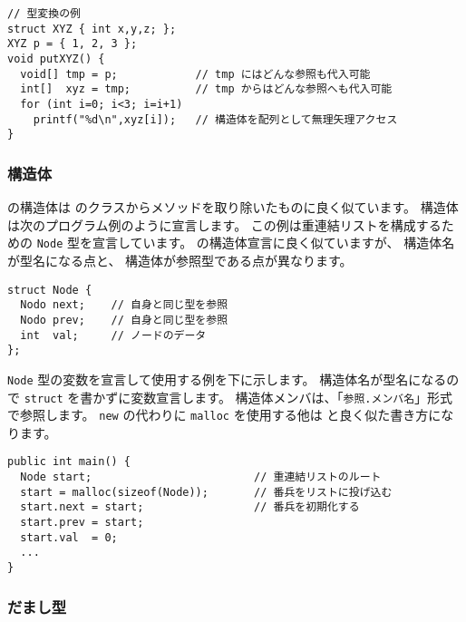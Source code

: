 \begin{mylist}
\begin{verbatim}
// 型変換の例
struct XYZ { int x,y,z; };
XYZ p = { 1, 2, 3 };
void putXYZ() {
  void[] tmp = p;            // tmp にはどんな参照も代入可能
  int[]  xyz = tmp;          // tmp からはどんな参照へも代入可能
  for (int i=0; i<3; i=i+1)
    printf("%d\n",xyz[i]);   // 構造体を配列として無理矢理アクセス
}
\end{verbatim}
\end{mylist}

\subsubsection{構造体}

\label{chap3:struct}
\cmml の構造体は \javal のクラスからメソッドを取り除いたものに良く似ています。
構造体は次のプログラム例のように宣言します。
この例は重連結リストを構成するための \verb/Node/ 型を宣言しています。
\cl の構造体宣言に良く似ていますが、
構造体名が型名になる点と、
構造体が参照型である点が異なります。

\begin{mylist}
\begin{verbatim}
struct Node {
  Nodo next;    // 自身と同じ型を参照
  Nodo prev;    // 自身と同じ型を参照
  int  val;     // ノードのデータ
};
\end{verbatim}
\end{mylist}

\verb/Node/ 型の変数を宣言して使用する例を下に示します。
構造体名が型名になるので \verb/struct/ を書かずに変数宣言します。
構造体メンバは、「\verb/参照.メンバ名/」形式で参照します。
\verb/new/ の代わりに \verb/malloc/ を使用する他は
\javal と良く似た書き方になります。

\begin{mylist}
\begin{verbatim}
public int main() {
  Node start;                         // 重連結リストのルート
  start = malloc(sizeof(Node));       // 番兵をリストに投げ込む
  start.next = start;                 // 番兵を初期化する
  start.prev = start;
  start.val  = 0;
  ...
}
\end{verbatim}
\end{mylist}

\subsubsection{だまし型}

